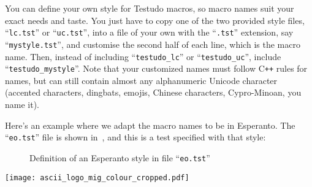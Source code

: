 \documentclass[twoside, a4paper, article]{memoir}
\providecommand\typesetexample[1]{%
}
\newcommand*\Cpp{C\texttt{++}}
\begin{document}
You can define your own style for Testudo macros, so macro names suit your
exact needs and taste.  You just have to copy one of the two provided style
files, ``\texttt{lc.tst}'' or ``\texttt{uc.tst}'', into a file of your own with
the ``\texttt{.tst}'' extension, say ``\texttt{mystyle.tst}'', and customise
the second half of each line, which is the macro name.  Then, instead of
including ``\texttt{testudo\_lc}'' or ``\texttt{testudo\_uc}'', include
``\texttt{testudo\_mystyle}''.  Note that your customized names must follow
\Cpp{} rules for names, but can still contain almost any alphanumeric Unicode
character (accented characters, dingbats, emojis, Chinese characters,
Cypro-Minoan, you name it).

Here's an example where we adapt the macro names to be in Esperanto.  The
``\texttt{eo.tst}'' file is shown in~, and this is a
test specified with that style:

\typesetexample{esperanto}

\begin{figure}
  \centering
  \caption{Definition of an Esperanto style in file ``\texttt{eo.tst}''}
  \label{fig:esperanto-style}
\end{figure}

\backmatter

\cleartoevenpage

\thispagestyle{empty}

\vspace*{\fill}

\begin{center}
\texttt{[image: ascii\_logo\_mig\_colour\_cropped.pdf]}
\end{center}
\end{document}
